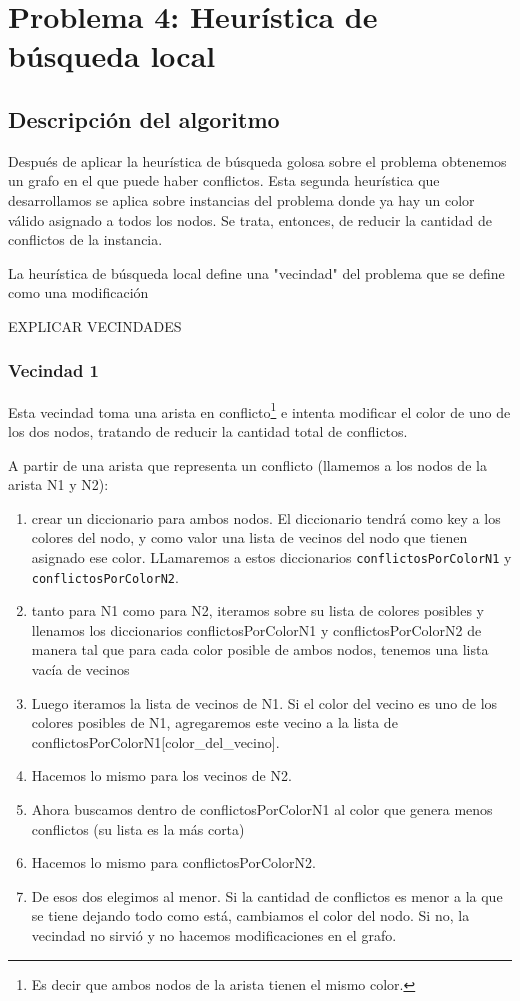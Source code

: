 \section{Problema 4: Heurística de búsqueda local}

\subsection{Descripción del algoritmo}

Después de aplicar la heurística de búsqueda golosa sobre el problema obtenemos un grafo en el que puede haber conflictos. Esta segunda heurística que desarrollamos se aplica sobre instancias del problema donde ya hay un color válido asignado a todos los nodos. Se trata, entonces, de reducir la cantidad de conflictos de la instancia.

La heurística de búsqueda local define una "vecindad" del problema que se define como una modificación 

EXPLICAR VECINDADES

\subsubsection{Vecindad 1}

Esta vecindad toma una arista en conflicto\footnote{Es decir que ambos nodos de la arista tienen el mismo color.} e intenta modificar el color de uno de los dos nodos, tratando de reducir la cantidad total de conflictos.

A partir de una arista que representa un conflicto (llamemos a los nodos de la arista N1 y N2):
\begin{enumerate}
 \item crear un diccionario para ambos nodos. El diccionario tendrá como key a los colores del nodo, y como valor una lista de vecinos del nodo que tienen asignado ese color. LLamaremos a estos diccionarios \texttt{conflictosPorColorN1} y \texttt{conflictosPorColorN2}.
 \item tanto para N1 como para N2, iteramos sobre su lista de colores posibles y llenamos los diccionarios conflictosPorColorN1 y conflictosPorColorN2 de manera tal que para cada color posible de ambos nodos, tenemos una lista vacía de vecinos
 \item Luego iteramos la lista de vecinos de N1. Si el color del vecino es uno de los colores posibles de N1, agregaremos este vecino a la lista de conflictosPorColorN1[color_del_vecino].
 \item Hacemos lo mismo para los vecinos de N2.
 \item Ahora buscamos dentro de conflictosPorColorN1 al color que genera menos conflictos (su lista es la más corta)
 \item Hacemos lo mismo para conflictosPorColorN2.
 \item De esos dos elegimos al menor. Si la cantidad de conflictos es menor a la que se tiene dejando todo como está, cambiamos el color del nodo. Si no, la vecindad no sirvió y no hacemos modificaciones en el grafo.
\end{enumerate}

